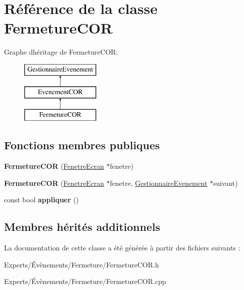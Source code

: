 \hypertarget{class_fermeture_c_o_r}{}\section{Référence de la classe Fermeture\+C\+OR}
\label{class_fermeture_c_o_r}
Graphe d\textquotesingle{}héritage de Fermeture\+C\+OR\+:\begin{figure}[H]
\begin{center}
\leavevmode
\includegraphics[height=3.000000cm]{class_fermeture_c_o_r}
\end{center}
\end{figure}
\subsection*{Fonctions membres publiques}
\begin{DoxyCompactItemize}
\item 
\mbox{\label{class_fermeture_c_o_r_a463bcc7c144ed96979c4da95eeac5106}} 
{\bfseries Fermeture\+C\+OR} (\mbox{\hyperlink{class_fenetre_ecran}{Fenetre\+Ecran}} $\ast$fenetre)
\item 
\mbox{\label{class_fermeture_c_o_r_af1e214a2c13927098dfa905a55d45774}} 
{\bfseries Fermeture\+C\+OR} (\mbox{\hyperlink{class_fenetre_ecran}{Fenetre\+Ecran}} $\ast$fenetre, \mbox{\hyperlink{class_gestionnaire_evenement}{Gestionnaire\+Evenement}} $\ast$suivant)
\item 
\mbox{\label{class_fermeture_c_o_r_a834d3ef4086874034bd5006484e96227}} 
const bool {\bfseries appliquer} ()
\end{DoxyCompactItemize}
\subsection*{Membres hérités additionnels}


La documentation de cette classe a été générée à partir des fichiers suivants \+:\begin{DoxyCompactItemize}
\item 
Experts/Évènements/\+Fermeture/Fermeture\+C\+O\+R.\+h\item 
Experts/Évènements/\+Fermeture/Fermeture\+C\+O\+R.\+cpp\end{DoxyCompactItemize}
